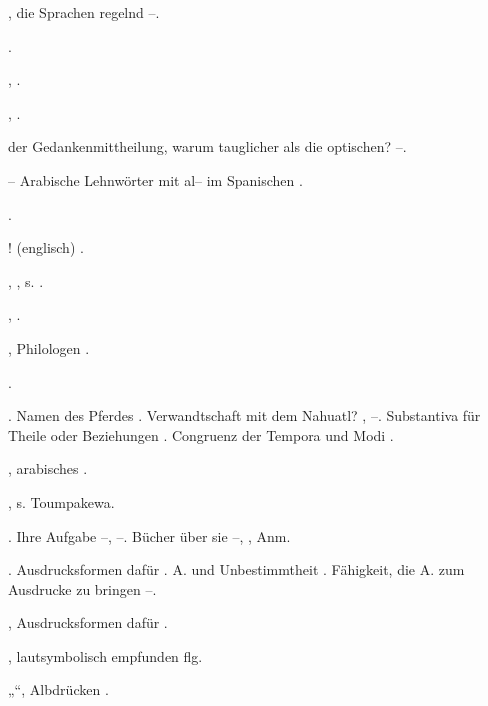 \begin{register}
, die Sprachen regelnd \pageref{sp.125}–\pageref{sp.126}. 

 \pageref{sp.177}.

 \pageref{sp.18}, \pageref{sp.389}.

 \pageref{sp.150}, \pageref{sp.282}.

 der Gedankenmittheilung, warum tauglicher als die optischen? \pageref{sp.311}–\pageref{sp.312}.


– Arabische Lehnwörter mit al– im Spanischen \pageref{sp.266}.

 \pageref{sp.303}.

! (englisch) \pageref{sp.360}.

, , s. .

 \pageref{sp.147}, \pageref{sp.383}.

, Philologen \pageref{sp.21}.

 \pageref{sp.162}.

. Namen des Pferdes \pageref{sp.41}. Verwandtschaft mit dem Nahuatl? \pageref{sp.147}, \sed{\pageref{sp.152},} \pageref{sp.172}–\pageref{sp.173}.  Substantiva für Theile oder Beziehungen \pageref{sp.441}. Congruenz der Tempora und Modi \pageref{sp.466}.

, arabisches \pageref{sp.157}.

, s. Toumpakewa.

. Ihre Aufgabe \pageref{sp.11}–\pageref{sp.12}, \pageref{sp.302}–\pageref{sp.303}. Bücher über sie \pageref{sp.48}–\pageref{sp.49}, \pageref{sp.52}, Anm.

. Ausdrucksformen dafür \pageref{sp.95}. A. und Unbestimmtheit \pageref{sp.326}. Fähigkeit, die A. zum Ausdrucke zu bringen \pageref{sp.446}–\pageref{sp.447}.

, Ausdrucksformen dafür \pageref{sp.95}.

, lautsymbolisch empfunden \pageref{sp.220} flg.

„“, Albdrücken \pageref{sp.127}.



\end{register}
